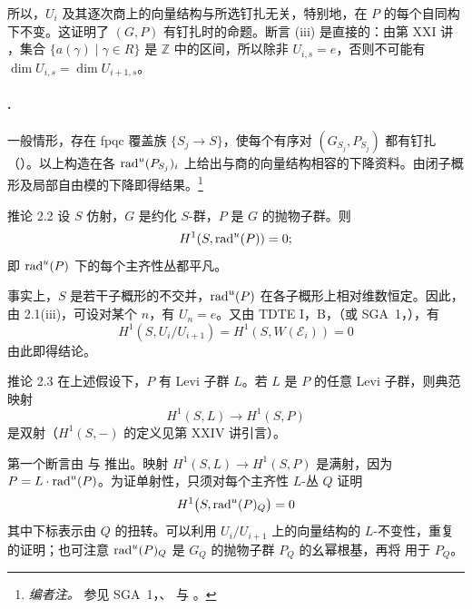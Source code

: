 所以，\(U_i\) 及其逐次商上的向量结构与所选钉扎无关，特别地，在 \(P\) 的每个自同构下不变。这证明了 \((G,P)\) 有钉扎时的命题。断言 (iii) 是直接的：由第 XXI 讲 ，集合 \(\{a(\gamma)\mid\gamma\in R\}\) 是 \(\mathbb Z\) 中的区间，所以除非 \(U_{i,s}=e\)，否则不可能有 \(\dim U_{i,s}=\dim U_{i+1,s}\)。

\paragraph{.}
一般情形，存在 fpqc 覆盖族 \(\{S_j\to S\}\)，使每个有序对 \((G_{S_j},P_{S_j})\) 都有钉扎（）。以上构造在各 \(\operatorname{rad}^u(P_{S_j})_i\) 上给出与商的向量结构相容的下降资料。由闭子概形及局部自由模的下降即得结果。\footnote{\emph{编者注。} 参见 SGA~1，、 与 。}

\begin{sgastatement}{推论 2.2}
设 \(S\) 仿射，\(G\) 是约化 \(S\)-群，\(P\) 是 \(G\) 的抛物子群。则
\[
 H^1(S,\operatorname{rad}^u(P))=0;
\]
即 \(\operatorname{rad}^u(P)\) 下的每个主齐性丛都平凡。
\end{sgastatement}

事实上，\(S\) 是若干子概形的不交并，\(\operatorname{rad}^u(P)\) 在各子概形上相对维数恒定。因此，由 2.1(iii)，可设对某个 \(n\)，有 \(U_n=e\)。又由 TDTE I，B，（或 SGA~1，），有
\[
 H^1(S,U_i/U_{i+1})
 =H^1(S,W(\mathcal E_i))=0
\]
由此即得结论。

\begin{sgastatement}{推论 2.3}
在上述假设下，\(P\) 有 Levi 子群 \(L\)。若 \(L\) 是 \(P\) 的任意 Levi 子群，则典范映射
\[
 H^1(S,L)\longrightarrow H^1(S,P)
\]
是双射（\(H^1(S,-)\) 的定义见第 XXIV 讲引言）。
\end{sgastatement}

第一个断言由  与  推出。映射 \(H^1(S,L)\to H^1(S,P)\) 是满射，因为 \(P=L\cdot\operatorname{rad}^u(P)\)。为证单射性，只须对每个主齐性 \(L\)-丛 \(Q\) 证明
\[
 H^1\bigl(S,\operatorname{rad}^u(P)_Q\bigr)=0
\]
其中下标表示由 \(Q\) 的扭转。可以利用 \(U_i/U_{i+1}\) 上的向量结构的 \(L\)-不变性，重复  的证明；也可注意 \(\operatorname{rad}^u(P)_Q\) 是 \(G_Q\) 的抛物子群 \(P_Q\) 的幺幂根基，再将  用于 \(P_Q\)。

